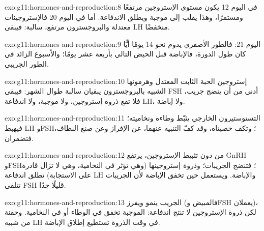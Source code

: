 \begin{solution}{exo:g11:hormones-and-reproduction:8}
في اليوم 12 يكون مستوى الإستروجين مرتفعًا ومستمرًا، وهذا يقلب  إلى موجبة ويطلق الاندفاعة. أما في اليوم 20 فالإستروجينات
معتدلة والبروجسترون مرتفع،  سالبة: فيبقى LH منخفضًا.
\end{solution}

\begin{solution}{exo:g11:hormones-and-reproduction:9}
اليوم 21: فالطور الأصفري يدوم نحو 14 يومًا أيًّا كان طول الدورة،
فالإباضة قبل الحيض التالي بأربعة عشر يومًا؛ والأسبوع الزائد في الطور
الجريبي.
\end{solution}

\begin{solution}{exo:g11:hormones-and-reproduction:10}
إستروجين الحبة الثابت المعتدل وهرمونها الشبيه بالبروجسترون يبقيان
 سالبة طوال الشهر: فيبقى FSH أدنى من أن ينضج جريب، فلا
تقع ذروة إستروجين، ولا  موجبة، ولا اندفاعة LH، ولا إباضة.
\end{solution}

\begin{solution}{exo:g11:hormones-and-reproduction:11}
التستوستيرون الخارجي يثبّط وطاءه ونخاميته؛ فيهبط LH وFSH؛ وتكف خصيتاه،
وقد كفّ التنبيه عنهما، عن الإفراز وعن صنع النطاف، فتضمران.
\end{solution}

\begin{solution}{exo:g11:hormones-and-reproduction:12}
من دون تثبيط الإستروجين، يرتفع GnRH وFSH؛ فتنضج الجريبات؛ وذروة
إستروجينها (وهي تؤثر في النخامية، وهي لا تزال قادرة على الاستجابة)
تطلق اندفاعة LH والإباضة. ويستعمل حين تخفق الإباضة لأن الجريبات تتلقى
FSH قليلًا جدًا.
\end{solution}

\begin{solution}{exo:g11:hormones-and-reproduction:13}
الجريب ينمو ويفرز (فالمبيض وFSH يعملان)، لكن ذروة الإستروجين لا تنتج
اندفاعة:  الموجبة تخفق في الوطاء أو في النخامية. وحقنة
من  شبيه  LH في وقت الذروة تستطيع إطلاق الإباضة.
\end{solution}

